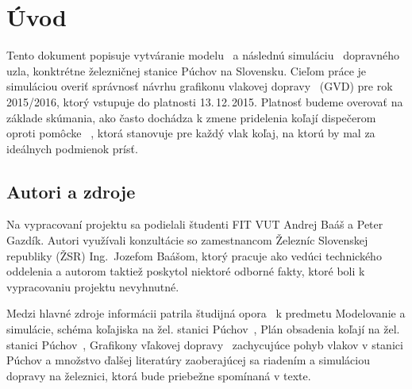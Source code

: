 \documentclass[12pt,a4paper,titlepage,final]{article}
\begin{document}


\pagestyle{plain}
\setcounter{page}{1}
\tableofcontents

\newpage
\pagestyle{plain}
\setcounter{page}{1}

\section{Úvod}

Tento dokument popisuje vytváranie modelu~\cite[str.\,6]{opora} a následnú simuláciu~\cite[str.\,7]{opora} dopravného uzla,
konktrétne železničnej stanice Púchov na Slovensku. Cieľom práce je simuláciou
overiť správnosť návrhu grafikonu vlakovej dopravy~\cite{wiki:gvd} (GVD) pre rok
2015/2016, ktorý vstupuje do platnosti 13.\,12.\,2015. Platnosť budeme overovať na základe skúmania, ako často dochádza k zmene pridelenia koľají dispečerom oproti pomôcke ~\cite[str.\,9]{szdc_d6}, ktorá stanovuje pre každý vlak koľaj, na ktorú by mal za ideálnych podmienok prísť.
\subsection{Autori a zdroje}

Na vypracovaní projektu sa podielali študenti FIT VUT Andrej Baáš a Peter Gazdík.
Autori využívali konzultácie so zamestnancom Železníc Slovenskej republiky (ŽSR)
Ing.~Jozefom Baášom, ktorý pracuje ako vedúci technického oddelenia a autorom taktiež
poskytol niektoré odborné fakty, ktoré boli k vypracovaniu projektu nevyhnutné.

Medzi hlavné zdroje informácii patrila študijná opora~\cite{opora} k predmetu
Modelovanie a simulácie, schéma koľajiska na žel. stanici Púchov~\cite{kolaje},
Plán obsadenia koľají na žel. stanici Púchov~\cite{pok}, Grafikony vľakovej
dopravy~\cite{gvd106}\cite{gvd125} zachycujúce pohyb vlakov v stanici Púchov a
množstvo ďalšej literatúry zaoberajúcej sa riadením a simuláciou dopravy na železnici,
ktorá bude priebežne spomínaná v texte.
\end{document}
